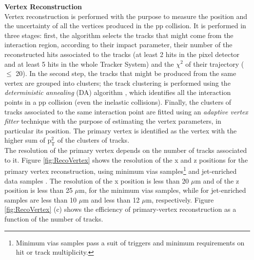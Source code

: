 \textbf{Vertex Reconstruction}\\

\noindent Vertex reconstruction is performed with the purpose to measure the position and the uncertainty
of all the vertices produced in the pp collision. It is performed in three stages: first, the 
algorithm selects the tracks that might come from the interaction region, according to 
their impact parameter, their number of the reconstructed hits associated
to the tracks (at least 2 hits in the pixel detector and at least 5 hits in the whole Tracker System) 
and the $\chi^{2}$ of their trajectory ($\leq $ 20). In the second step, the tracks
that might be produced from the same vertex are grouped into clusters; the track clustering 
is performed using the \textit{deterministic annealing} (DA) algorithm \cite{DAnnealing}, which 
identifies all the interaction points in a pp collision (even the inelastic collisions). Finally, 
the clusters of tracks associated to the same interaction point are fitted using an
\textit{adaptive vertex fitter} technique \cite{AdaptiveVertexFitting} with the purpose 
of estimating the vertex parameters, in particular its position. The primary vertex is identified
as the vertex with the higher sum of $\textrm{p}_{\textrm{T}}^{2}$ of the clusters of tracks.\\

\noindent The resolution of the primary vertex depends on the number of tracks associated to it. Figure \ref{fig:RecoVertex} 
shows the resolution of the x and z positions for the primary vertex reconstruction, using minimum vias 
samples\footnote{Minimum vias samples pass a suit of triggers and minimum requirements on hit 
or track multiplicity.} and jet-enriched data samples \cite{TrackAndVertexReconstruction}. The resolution 
of the x position is less than 20 $\mu$m and of the z position is less than 25 $\mu$m, for the 
minimum vias samples, while for jet-enriched samples are less than 10 $\mu$m and less than 
12 $\mu$m, respectively. Figure \ref{fig:RecoVertex} (c) shows
the efficiency of primary-vertex reconstruction as a function of the number of tracks. 

